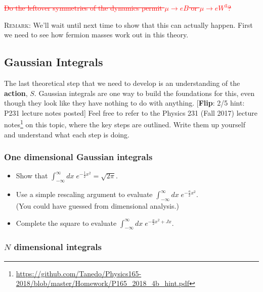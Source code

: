 \documentclass[12pt]{article}
\newcommand{\flip}[1]{{\color{red} [\textbf{Flip}: {#1}]}}
\begin{document}
\textcolor{red}{\sout{Do the leftover symmetries of the dynamics permit $\mu\to e B$ or $\mu \to e W^3$?}}

\textsc{Remark}: We'll wait until next time to show that this can actually happen. First we need to see how fermion masses work out in this theory.


\subsection{Gaussian Integrals}

The last theoretical step that we need to develop is an understanding of the \textbf{action}, $S$. Gaussian integrals are one way to build the foundations for this, even though they look like they have nothing to do with anything. \flip{2/5 hint: P231 lecture notes posted} Feel free to refer to the Physics 231 (Fall 2017) lecture notes\footnote{\url{https://github.com/Tanedo/Physics165-2018/blob/master/Homework/P165_2018_4b_hint.pdf}} on this topic, where the key steps are outlined. Write them up yourself and understand what each step is doing.

\subsubsection{One dimensional Gaussian integrals}

\begin{itemize}
	\item Show that $\int_{-\infty}^\infty dx\; e^{-\frac 12 x^2} = \sqrt{2\pi}$.
	\item Use a simple rescaling argument to evaluate $\int_{-\infty}^\infty dx\; e^{-\frac a2 x^2}$. \\(You could have guessed from dimensional analysis.)
	\item Complete the square to evaluate $\int_{-\infty}^\infty dx\; e^{-\frac a2 x^2 + Jx}$.
\end{itemize}

\subsubsection{$N$ dimensional integrals}
\end{document}
